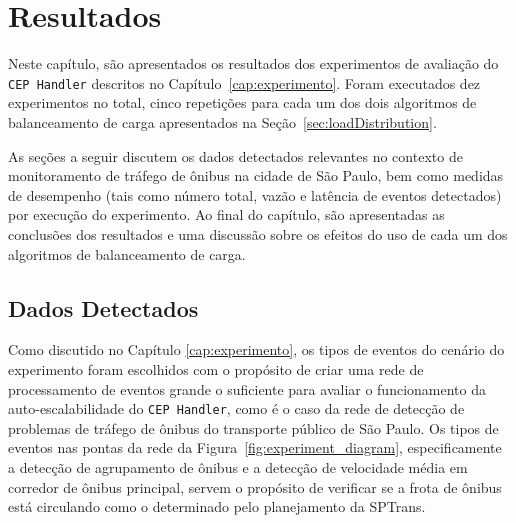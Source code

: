 \chapter{Resultados}
\label{cap:resultados}

Neste capítulo, são apresentados os resultados dos experimentos de avaliação do \texttt{CEP Handler} descritos no Capítulo~\ref{cap:experimento}. Foram executados dez experimentos no total, cinco repetições para cada um dos dois algoritmos de balanceamento de carga apresentados na Seção~\ref{sec:loadDistribution}. 

As seções a seguir discutem os dados detectados relevantes no contexto de monitoramento de tráfego de ônibus na cidade de São Paulo, bem como medidas de desempenho (tais como número total, vazão e latência de eventos detectados) por execução do experimento. 
Ao final do capítulo, são apresentadas as conclusões dos resultados e uma discussão sobre os efeitos do uso de cada um dos algoritmos de balanceamento de carga. 

\section{Dados Detectados}

Como discutido no Capítulo \ref{cap:experimento}, os tipos de eventos do cenário do experimento foram escolhidos com o propósito de criar uma rede de processamento de eventos grande o suficiente para avaliar o funcionamento da auto-escalabilidade do \texttt{CEP Handler}, como é o caso da rede de detecção de problemas de tráfego de ônibus do transporte público de São Paulo.
Os tipos de eventos nas pontas da rede da Figura~\ref{fig:experiment_diagram}, especificamente a detecção de agrupamento de ônibus e a detecção de velocidade média em corredor de ônibus principal, servem o propósito de verificar se a frota de ônibus está circulando como o determinado pelo planejamento da SPTrans. 

